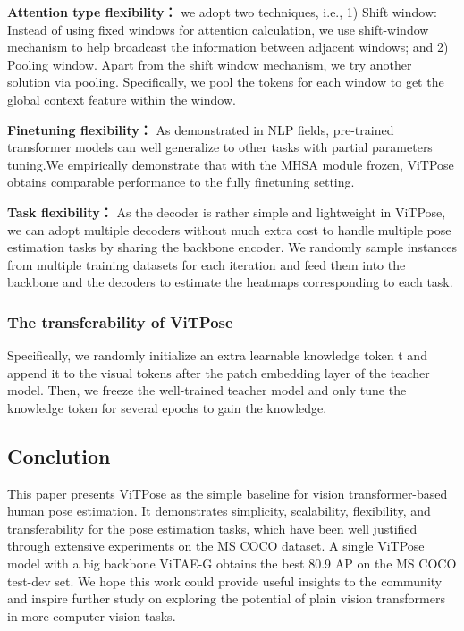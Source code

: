 \documentclass[11pt]{article}
\begin{document}
\textbf{Attention type flexibility：}
we adopt two techniques, i.e., 1) Shift window: Instead of using fixed windows for attention calculation, we use shift-window mechanism to help broadcast the information between adjacent windows; and 2) Pooling window. Apart from the shift window mechanism, we try another solution via pooling. Specifically, we pool the tokens for each window to get the global context feature within the window.

\textbf{Finetuning flexibility：}
As demonstrated in NLP fields, pre-trained transformer models can well generalize to other tasks with partial parameters tuning.We empirically demonstrate that with the MHSA module frozen, ViTPose obtains comparable performance to the fully finetuning setting.

\textbf{Task flexibility：}
As the decoder is rather simple and lightweight in ViTPose, we can adopt multiple decoders without much extra cost to handle multiple pose estimation tasks by sharing the backbone encoder. We randomly sample instances from multiple training datasets for each iteration and feed them into the backbone and the decoders to estimate the heatmaps corresponding to each task.
\subsubsection{The transferability of ViTPose}
Specifically, we randomly initialize an extra learnable knowledge token t and append it to the visual tokens after the patch embedding layer of the teacher model. Then, we freeze the well-trained teacher model and only tune the knowledge token for several epochs to gain the knowledge.
\subsection{Conclution}
This paper presents ViTPose as the simple baseline for vision transformer-based human pose estimation. It demonstrates simplicity, scalability, flexibility, and transferability for the pose estimation tasks, which have been well justified through extensive experiments on the MS COCO dataset. A single ViTPose model with a big backbone ViTAE-G obtains the best 80.9 AP on the MS COCO test-dev set. We hope this work could provide useful insights to the community and inspire further study on exploring the potential of plain vision transformers in more computer vision tasks.
\end{document}
